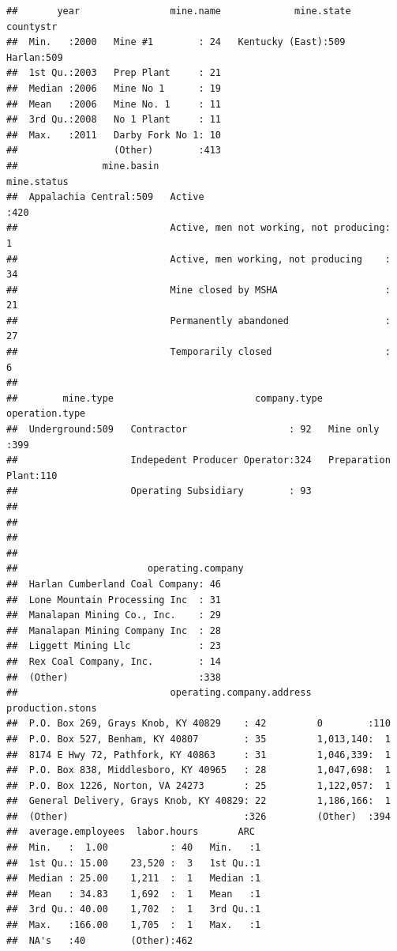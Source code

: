 \documentclass[12pt,]{article}
\begin{document}
\begin{verbatim}
##       year                mine.name             mine.state   countystr  
##  Min.   :2000   Mine #1        : 24   Kentucky (East):509   Harlan:509  
##  1st Qu.:2003   Prep Plant     : 21                                     
##  Median :2006   Mine No 1      : 19                                     
##  Mean   :2006   Mine No. 1     : 11                                     
##  3rd Qu.:2008   No 1 Plant     : 11                                     
##  Max.   :2011   Darby Fork No 1: 10                                     
##                 (Other)        :413                                     
##               mine.basin                                  mine.status 
##  Appalachia Central:509   Active                                :420  
##                           Active, men not working, not producing:  1  
##                           Active, men working, not producing    : 34  
##                           Mine closed by MSHA                   : 21  
##                           Permanently abandoned                 : 27  
##                           Temporarily closed                    :  6  
##                                                                       
##        mine.type                         company.type           operation.type
##  Underground:509   Contractor                  : 92   Mine only        :399   
##                    Indepedent Producer Operator:324   Preparation Plant:110   
##                    Operating Subsidiary        : 93                           
##                                                                               
##                                                                               
##                                                                               
##                                                                               
##                       operating.company
##  Harlan Cumberland Coal Company: 46    
##  Lone Mountain Processing Inc  : 31    
##  Manalapan Mining Co., Inc.    : 29    
##  Manalapan Mining Company Inc  : 28    
##  Liggett Mining Llc            : 23    
##  Rex Coal Company, Inc.        : 14    
##  (Other)                       :338    
##                           operating.company.address  production.stons
##  P.O. Box 269, Grays Knob, KY 40829    : 42         0        :110    
##  P.O. Box 527, Benham, KY 40807        : 35         1,013,140:  1    
##  8174 E Hwy 72, Pathfork, KY 40863     : 31         1,046,339:  1    
##  P.O. Box 838, Middlesboro, KY 40965   : 28         1,047,698:  1    
##  P.O. Box 1226, Norton, VA 24273       : 25         1,122,057:  1    
##  General Delivery, Grays Knob, KY 40829: 22         1,186,166:  1    
##  (Other)                               :326         (Other)  :394    
##  average.employees  labor.hours       ARC   
##  Min.   :  1.00           : 40   Min.   :1  
##  1st Qu.: 15.00    23,520 :  3   1st Qu.:1  
##  Median : 25.00    1,211  :  1   Median :1  
##  Mean   : 34.83    1,692  :  1   Mean   :1  
##  3rd Qu.: 40.00    1,702  :  1   3rd Qu.:1  
##  Max.   :166.00    1,705  :  1   Max.   :1  
##  NA's   :40        (Other):462
\end{verbatim}
\end{document}
